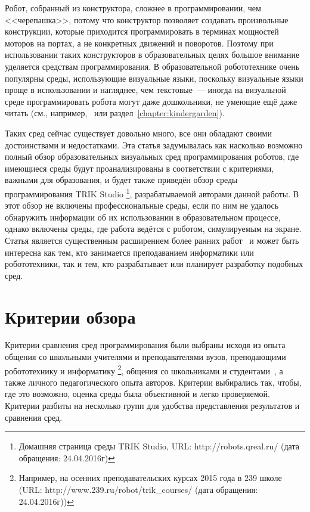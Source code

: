 \documentclass[a5paper]{article}
\begin{document}
Робот, собранный из конструктора, сложнее в программировании, чем <<черепашка>>, потому что конструктор позволяет 
создавать произвольные конструкции, которые приходится программировать в терминах мощностей моторов на портах, 
а не конкретных движений и поворотов. Поэтому при использовании таких конструкторов в образовательных целях 
большое внимание уделяется средствам программирования. В образовательной робототехнике очень популярны 
среды, использующие визуальные языки, поскольку визуальные языки проще в использовании и нагляднее, чем 
текстовые~--- иногда на визуальной среде программировать робота могут даже дошкольники, не умеющие ещё 
даже читать (см., например,~\cite{portsmore1999robolab} или раздел~\ref{chapter:kindergarden}).

Таких сред сейчас существует довольно много, все они обладают своими достоинствами и недостатками. Эта статья 
задумывалась как насколько возможно полный обзор образовательных визуальных сред программирования роботов, 
где имеющиеся среды будут проанализированы в соответствии с критериями, важными для образования, и будет 
также приведён обзор среды программирования TRIK Studio%
\footnote{Домашняя страница среды TRIK Studio, URL: http://robots.qreal.ru/ (дата обращения: 24.04.2016г)}, 
разрабатываемой авторами данной работы. В этот 
обзор не включены профессиональные среды, если по ним не удалось обнаружить информации об их 
использовании в образовательном процессе, однако включены среды, где работа ведётся с роботом, симулируемым 
на экране. Статья является существенным расширением более ранних работ~\cite{litvinov2013robots,litvinov2012robots} и
может быть интересна как тем, кто занимается преподаванием информатики или робототехники, 
так и тем, кто разрабатывает или планирует разработку подобных сред.

\section{Критерии обзора}
\label{chapter:criterion}

Критерии сравнения сред программирования были выбраны исходя из опыта общения со школьными учителями и 
преподавателями вузов, преподающими робототехнику и информатику%
\footnote{Например, на осенних преподавательских курсах 2015 года в 239 школе (URL: http://www.239.ru/robot/trik\_courses/ (дата обращения: 24.04.2016г))}, 
общения со школьниками и студентами~\cite{sokovikova2012qrealrobots}, 
а также личного педагогического опыта авторов. Критерии выбирались так, чтобы, где это возможно, оценка 
среды была объективной и легко проверяемой. Критерии разбиты на несколько групп для удобства представления результатов 
и сравнения сред.
\end{document}

